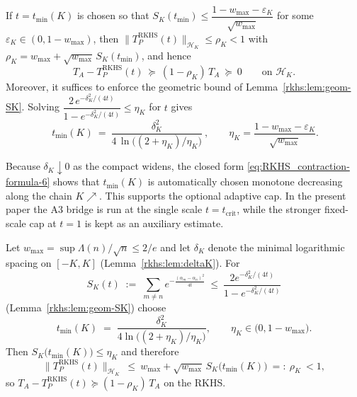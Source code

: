 \begin{theorem}\label{rkhs:thm:rkhs-contraction}
If $t=t_{\min}(K)$ is chosen so that $S_K(t_{\min})\le \dfrac{1-w_{\max}-\varepsilon_K}{\sqrt{w_{\max}}}$ for some $\varepsilon_K\in(0,1-w_{\max})$, then $\|T_P^{\mathrm{RKHS}}(t)\|_{\mathcal H_K}\le \rho_K<1$ with $\rho_K=w_{\max}+\sqrt{w_{\max}}\,S_K(t_{\min})$, and hence
\begin{equation}\label{eq:RKHS_contraction-formula-3}
T_A-T_P^{\mathrm{RKHS}}(t)\ \succeq\ (1-\rho_K)\,T_A\ \succeq\ 0\qquad\text{on }\mathcal H_K.
\end{equation}
Moreover, it suffices to enforce the geometric bound of Lemma~\ref{rkhs:lem:geom-SK}. Solving $\dfrac{2\,e^{-\delta_K^2/(4t)}}{1-e^{-\delta_K^2/(4t)}}\le \eta_K$ for $t$ gives
\begin{equation}\label{eq:RKHS_contraction-formula-6}
 \boxed{\ t_{\min}(K)\ =\ \frac{\delta_K^2}{4\,\ln\!\bigl((2+\eta_K)/\eta_K\bigr)}\ },\qquad \eta_K=\frac{1-w_{\max}-\varepsilon_K}{\sqrt{w_{\max}}}.
\end{equation}
\end{theorem}

\begin{remark}
Because $\delta_K\downarrow0$ as the compact widens, the closed form \eqref{eq:RKHS_contraction-formula-6} shows that $t_{\min}(K)$ is automatically chosen monotone decreasing along the chain $K\nearrow$. This supports the optional adaptive cap. In the present paper the A3 bridge is run at the single scale $t=t_{\mathrm{crit}}$, while the stronger fixed-scale cap at $t=1$ is kept as an auxiliary estimate.
\end{remark}

\begin{proposition}\label{prop:rkhs-schedule}
Let $w_{\max}=\sup \Lambda(n)/\sqrt{n}\le 2/e$ and let $\delta_K$ denote the minimal logarithmic spacing on $[-K,K]$ (Lemma~\ref{rkhs:lem:deltaK}). For
\[
S_K(t)\;:=\;\sum_{m\neq n} e^{-\frac{(\alpha_m-\alpha_n)^2}{4t}}\ \le\ \frac{2e^{-\delta_K^2/(4t)}}{1-e^{-\delta_K^2/(4t)}}
\]
(Lemma~\ref{rkhs:lem:geom-SK}) choose
\[
t_{\min}(K)\;=\;\frac{\delta_K^2}{4\ln\!\bigl((2+\eta_K)/\eta_K\bigr)},\qquad \eta_K\in\bigl(0,1-w_{\max}\bigr).
\]
Then $S_K\bigl(t_{\min}(K)\bigr)\le \eta_K$ and therefore
\[
\|T_P^{\mathrm{RKHS}}(t)\|_{\mathcal H_K}\ \le\ w_{\max}+\sqrt{w_{\max}}\,S_K\bigl(t_{\min}(K)\bigr)
\ =:\ \rho_K\ < 1,
\]
so $T_A-T_P^{\mathrm{RKHS}}(t)\succeq(1-\rho_K)\,T_A$ on the RKHS.
\end{proposition}

